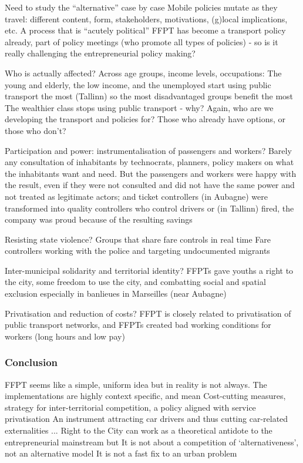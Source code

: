 \documentclass{article}
\begin{document}
\begin{outline}
	\1 Need to study the ``alternative'' case by case
		\2 Mobile policies mutate as they travel: different content, form, stakeholders, motivations, (g)local implications, etc.
		\2 A process that is ``acutely political''
		\2 FFPT has become a transport policy already, part of policy meetings (who promote all types of policies) - so is it really challenging the entrepreneurial policy making?

	\1 Who is actually affected? Across age groups, income levels, occupations:
		\2 The young and elderly, the low income, and the unemployed start using public transport the most (Tallinn) so the most disadvantaged groups benefit the most
		\2 The wealthier class stops using public transport - why? Again, who are we developing the transport and policies for? Those who already have options, or those who don't?

	\1 Participation and power: instrumentalisation of passengers and workers? Barely any consultation of inhabitants by technocrats, planners, policy makers on what the inhabitants want and need. But the passengers and workers were happy with the result, even if they were not consulted and did not have the same power and not treated as legitimate actors; and ticket controllers (in Aubagne) were transformed into quality controllers who control drivers or (in Tallinn) fired, the company was proud because of the resulting savings

	\1 Resisting state violence? 
		\2 Groups that share fare controls in real time
		\2 Fare controllers working with the police and targeting undocumented migrants
		
	\1 Inter-municipal solidarity and territorial identity?
		\2 FFPTs gave youths a right to the city, some freedom to use the city, and combatting social and spatial exclusion especially in banlieues in Marseilles (near Aubagne)
	
	\1 Privatisation and reduction of costs?
		\2 FFPT is closely related to privatisation of public transport networks, and FFPTs created bad working conditions for workers (long hours and low pay)
\end{outline}

\subsubsection{Conclusion}

\begin{outline}
	\1 FFPT seems like a simple, uniform idea but in reality is not always. The implementations are highly context specific, and mean
		\2 Cost-cutting measures, strategy for inter-territorial competition, a policy aligned with service privatisation
		\2 An instrument attracting car drivers and thus cutting car-related externalities
		\2 ...
	\1 Right to the City can work as a theoretical antidote to the entrepreneurial mainstream but
		\2 It is not about a competition of `alternativeness', not an alternative model
		\2 It is not a fast fix to an urban problem
\end{outline}
\end{document}

